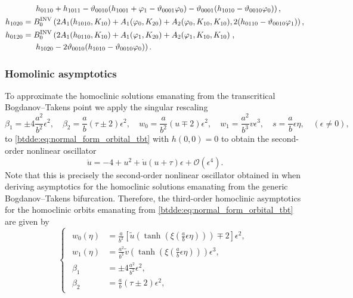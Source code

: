 \begin{equation}
\begin{aligned}
            & \left. h_{0110} + h_{1011} - \vartheta_{0010} (h_{1001} + \varphi_1 - \vartheta_{0001} \varphi_0) - \vartheta_{0001} (h_{1010} - \vartheta_{0010} \varphi_0) \right), \\
h_{1020} ={}& B^{\mathrm{INV}}_{0} \left(2 A_1(h_{1010},K_{10}) + A_1(\varphi_0,K_{20}) + A_2(\varphi_0,K_{10},K_{10}), 2(h_{0110} - \vartheta_{0010} \varphi_1) \right), \\
h_{0120} ={}& B^{\mathrm{INV}}_{0} \left(2 A_1(h_{0110},K_{10}) + A_1(\varphi_1,K_{20}) + A_2(\varphi_1,K_{10},K_{10})\right., \\
                         & \left.h_{1020} - 2 \vartheta_{0010} (h_{1010} - \vartheta_{0010} \varphi_0)\right). \\
\end{aligned}
\end{equation}

\subsubsection{Homolinic asymptotics}
\label{btdde:sec:transcritical_bt_homoclinic_asymptotics}
To approximate the homoclinic solutions emanating from the transcritical Bogdanov--Takens point
we apply the singular rescaling
\begin{equation}
\label{btdde:eq:blowup}				
\beta_1 = \pm 4 \frac{a^2}{b^2} \epsilon^2, \quad 
\beta_2 = \frac a b \left(\tau \pm 2\right) \epsilon^2, \quad 
w_0 = \frac a{b^2} (u \mp 2) \epsilon^2, \quad
w_1 = \frac{a^2}{b^3} v \epsilon^3, \quad
s = \frac ab \epsilon \eta, \quad (\epsilon \neq 0),
\end{equation}
to \cref{btdde:eq:normal_form_orbital_tbt} with $h(0,0)=0$ to obtain the second-order
nonlinear oscillator
\begin{equation}
    \label{btdde:eq:second_order_nonlinear_oscillator}
    \ddot u = -4 + u^2 + \dot u \left( u + \tau \right)\epsilon + \mathcal O(\epsilon^4).
\end{equation}
Note that this is precisely the second-order nonlinear oscillator obtained in
\cite{Bosschaert@Interplay} when deriving asymptotics for the homoclinic
solutions emanating from the generic Bogdanov--Takens bifurcation.
Therefore, the third-order homoclinic asymptotics for the homoclinic orbits emanating from \cref{btdde:eq:normal_form_orbital_tbt}
are given by
\begin{equation}
\label{btdde:eq:third_order_predictor_LP_tau_tbt}
\begin{cases}
\begin{aligned}
w_0(\eta)  &= \frac{a}{b^2} \left[ \tilde {u}\left(\tanh\left(\xi\left(\frac{a}{b}\epsilon\eta\right)\right)\right) \mp 2 \right] \epsilon^2, \\
w_1(\eta)  &= \frac{a^2}{b^3} \tilde {v}\left(\tanh\left(\xi\left(\frac{a}{b}\epsilon\eta\right)\right)\right) \epsilon^3, \\
\beta_1 &= \pm 4 \frac{a^2}{b^2} \epsilon^2, \\
\beta_2 &= \frac a b \left(\tau \pm 2\right) \epsilon^2, \quad 
\end{aligned}
\end{cases}
\end{equation}
